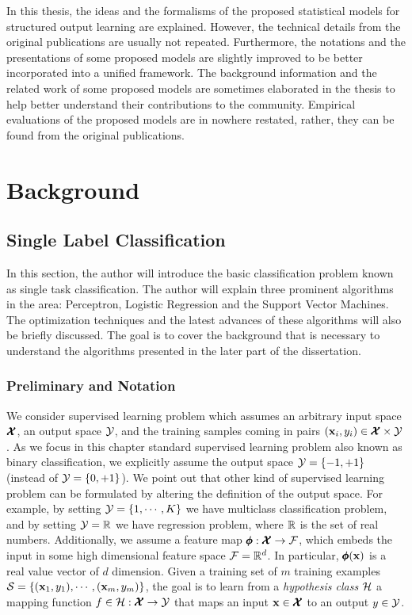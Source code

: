 In this thesis, the ideas and the formalisms of the proposed statistical models for structured output learning are explained.
However, the technical details from the original publications are usually not repeated.
Furthermore, the notations and the presentations of some proposed models are slightly improved to be better incorporated into a unified framework.
The background information and the related work of some proposed models are sometimes elaborated in the thesis to help better understand their contributions to the community.
Empirical evaluations of the proposed models are in nowhere restated, rather, they can be found from the original publications. 





\chapter{Background}\label{ch_background}


%
\section{Single Label Classification}\label{sc_single}

In this section, the author will introduce the basic classification problem known as single task classification.
The author will explain three prominent algorithms in the area: Perceptron, Logistic Regression and the Support Vector Machines.
The optimization techniques and the latest advances of these algorithms will also be briefly discussed.
The goal is to cover the background that is necessary to understand the algorithms presented in the later part of the dissertation. 

%
%
\subsection{Preliminary and Notation}\label{singlelabel_preliminary}
We consider supervised learning problem which assumes an arbitrary input space $\pmb {\mathcal{X}}$, an output space $\mathcal{Y}$, and the training samples coming in pairs $(\mathbf {x}_i,y_i)\in\pmb {\mathcal{X}}\times\mathcal{Y}$.
As we focus in this chapter standard supervised learning problem also known as binary classification, we explicitly assume the output space $\mathcal{Y}=\{-1,+1\}$ (instead of $\mathcal{Y}=\{0,+1\}$).
We point out that other kind of supervised learning problem can be formulated by altering the definition of the output space.
For example, by setting $\mathcal{Y}=\{1,\cdots,K\}$ we have multiclass classification problem, and by setting $\mathcal{Y}=\mathbb{R}$ we have regression problem, where $\mathbb{R}$ is the set of real numbers.
Additionally, we assume a feature map $\pmb \phi:\pmb {\mathcal{X}}\rightarrow\mathcal{F}$, which embeds the input in some high dimensional feature space $\mathcal{F}=\mathbb{R}^d$.
In particular, $\pmb \phi(\mathbf {x})$ is a real value vector of $d$ dimension.
Given a training set of $m$ training examples $\mathcal{S}=\{(\mathbf {x}_1,y_1),\cdots,(\mathbf {x}_m,y_m)\}$, the goal is to learn from a \textit{hypothesis class} $\mathcal{H}$ a mapping function $f\in\mathcal{H}:\pmb {\mathcal{X}}\rightarrow\mathcal{Y}$  that maps an input $\mathbf {x}\in\pmb {\mathcal{X}}$ to an output $y\in\mathcal{Y}$. 

